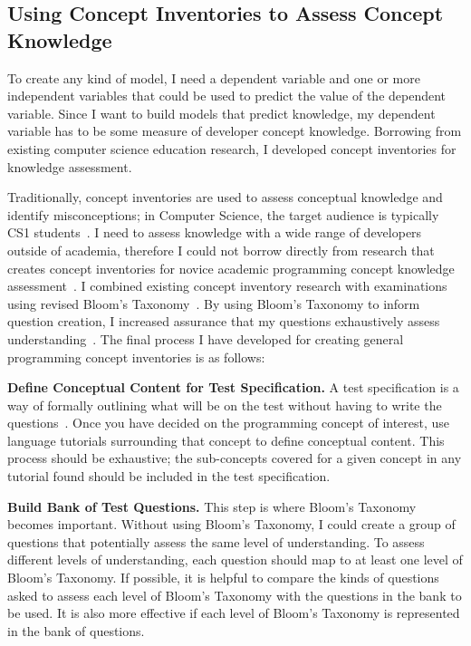 \documentclass{llncs}
\begin{document}
\subsection{Using Concept Inventories to Assess Concept Knowledge}
To create any kind of model, I need a dependent variable and one or more independent variables that could be used to predict the value of the dependent variable. Since I want to build models that predict knowledge, my dependent variable has to be some measure of developer concept knowledge.
Borrowing from existing computer science education research, I developed concept inventories for knowledge assessment. 


Traditionally, concept inventories are used to  assess conceptual knowledge and identify misconceptions; in Computer Science, the target audience is typically CS1 students~\cite{tew2010developing,kaczmarczyk2010identifying}. 
I need to assess knowledge with a wide range of developers outside of academia, therefore I could not borrow directly from research that creates concept inventories for novice academic programming concept knowledge assessment~\cite{tew2010assessing}. I combined existing concept inventory research with examinations using revised Bloom's Taxonomy~\cite{tew2010developing,nelson1967testing,scott2003bloom}. By using Bloom's Taxonomy to inform question creation, I increased assurance that my questions exhaustively assess understanding~\cite{scott2003bloom}. 
The final process I have developed for creating general programming concept inventories is as follows:

\vspace{0.5em}
\noindent\textbf{Define Conceptual Content for Test Specification.} A test specification is a way of formally outlining what will be on the test without having to write the questions~\cite{tew2010developing}. Once you have decided on the programming concept of interest, use language tutorials surrounding that concept to define conceptual content. This process should be exhaustive; the sub-concepts covered for a given concept in any tutorial found should be included in the test specification.

\vspace{0.5em}

\noindent\textbf{Build Bank of Test Questions.} This step is where Bloom's Taxonomy becomes important. Without using Bloom's Taxonomy, I could create a group of questions that potentially assess the same level of understanding. To assess different levels of understanding, each question should map to at least one level of Bloom's Taxonomy. If possible, it is helpful to compare the kinds of questions asked to assess each level of Bloom's Taxonomy with the questions in the bank to be used.
It is also more effective if each level of Bloom's Taxonomy is represented in the bank of questions.
\end{document}
